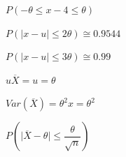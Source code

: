 \documentclass[DIV=calc,paper=a4,fontsize=11pt,openany]{book}
\begin{document}
\begin{center}
$P(-\theta \leq x-4\leq \theta)$
\end{center}
\begin{center}
$P(\mid x - u \mid \leq 2\theta) \cong 0.9544$
\end{center}
\begin{center}
$P(\mid x - u \mid \leq 3\theta) \cong 0.99$
\end{center}
\begin{center}
$u\overline{X} = u = \theta$
\end{center}
\begin{center}
$Var(\overline{X}) = \theta^{2}x = \theta^{2}$
\end{center}
\begin{center}
$  P(\mid \overline{X} - \theta \mid \leq \dfrac{\theta}{\sqrt{n}})$
\end{center}
\end{document}
